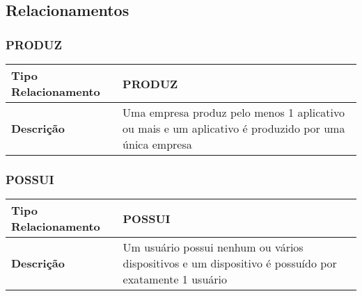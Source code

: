 

\subsection{Relacionamentos}
\vspace{5mm}


\subsubsection{PRODUZ}
\label{produz}

\begin{center}
	\begin{tabular}{|p{4.5cm}|p{12.9cm}|}
	\hline

	\textbf{Tipo Relacionamento} & PRODUZ
	\\ \hline

	\textbf{Descrição} & Uma empresa produz pelo menos 1 aplicativo ou mais e um aplicativo é produzido por uma única empresa
	\\ \hline

	\end{tabular}
\end{center}

\vspace{1mm}

\subsubsection{POSSUI}
\label{possui}

\begin{center}
	\begin{tabular}{|p{4.5cm}|p{12.9cm}|}
	\hline

	\textbf{Tipo Relacionamento} & POSSUI
	\\ \hline

	\textbf{Descrição} & Um usuário possui nenhum ou vários dispositivos e um dispositivo é possuído por exatamente 1 usuário
	\\ \hline

	\end{tabular}
\end{center}

